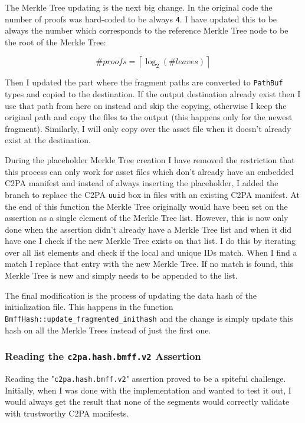 The Merkle Tree updating is the next big change. In the original code the number of proofs was hard-coded to be always \texttt{4}. I have updated this to be always the number which corresponds to the reference Merkle Tree node to be the root of the Merkle Tree:

\begin{equation}
    \#proofs = \left\lceil \log_2({\#leaves}) \right\rceil
    \label{eq:proofs}
\end{equation}

Then I updated the part where the fragment paths are converted to \texttt{PathBuf} types and copied to the destination. If the output destination already exist then I use that path from here on instead and skip the copying, otherwise I keep the original path and copy the files to the output (this happens only for the newest fragment). Similarly, I will only copy over the asset file when it doesn't already exist at the destination.

During the placeholder Merkle Tree creation I have removed the restriction that this process can only work for asset files which don't already have an embedded C2PA manifest and instead of always inserting the placeholder, I added the branch to replace the C2PA \texttt{uuid} box in files with an existing C2PA manifest. At the end of this function the Merkle Tree originally would have been set on the assertion as a single element of the Merkle Tree list. However, this is now only done when the assertion didn't already have a Merkle Tree list and when it did have one I check if the new Merkle Tree exists on that list. I do this by iterating over all list elements and check if the local and unique IDs match. When I find a match I replace that entry with the new Merkle Tree. If no match is found, this Merkle Tree is new and simply needs to be appended to the list.

The final modification is the process of updating the data hash of the initialization file. This happens in the function \texttt{BmffHash::update\_fragmented\_inithash} and the change is simply update this hash on all the Merkle Trees instead of just the first one.

\subsubsection{Reading the \texttt{c2pa.hash.bmff.v2} Assertion}

Reading the "\texttt{c2pa.hash.bmff.v2}" assertion proved to be a spiteful challenge. Initially, when I was done with the implementation and wanted to test it out, I would always get the result that none of the segments would correctly validate with trustworthy C2PA manifests.

